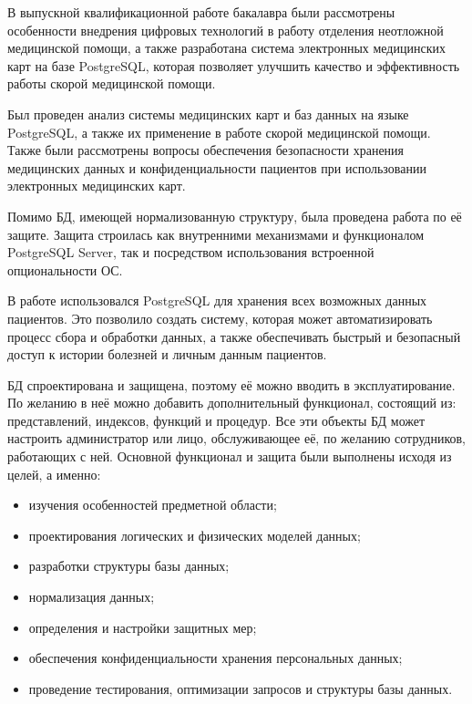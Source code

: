 \conclusion

В выпускной квалификационной работе бакалавра были рассмотрены особенности внедрения цифровых технологий в работу отделения неотложной медицинской помощи, а также разработана система электронных медицинских карт на базе PostgreSQL, которая позволяет улучшить качество и эффективность работы скорой медицинской помощи.

Был проведен анализ системы медицинских карт и баз данных на языке PostgreSQL, а также их применение в работе скорой медицинской помощи. Также были рассмотрены вопросы обеспечения безопасности хранения медицинских данных и конфиденциальности пациентов при использовании электронных медицинских карт.

Помимо БД, имеющей нормализованную структуру, была проведена работа по её защите. Защита строилась как внутренними механизмами и функционалом PostgreSQL Server, так и посредством использования встроенной опциональности ОС.

В работе использовался PostgreSQL для хранения всех возможных данных пациентов. Это позволило создать систему, которая может автоматизировать процесс сбора и обработки данных, а также обеспечивать быстрый и безопасный доступ к истории болезней и личным данным пациентов.

БД спроектирована и защищена, поэтому её можно вводить в эксплуатирование. По желанию в неё можно добавить дополнительный функционал, состоящий из: представлений, индексов, функций и процедур. Все эти объекты БД может настроить администратор или лицо, обслуживающее её, по желанию сотрудников, работающих с ней. Основной функционал и защита были выполнены исходя из целей, а именно:

\begin{itemize}
    \item изучения особенностей предметной области;
    \item проектирования логических и физических моделей данных;
    \item разработки структуры базы данных;
    \item нормализация данных;
    \item определения и настройки защитных мер;
    \item обеспечения конфиденциальности хранения персональных данных;
    \item проведение тестирования, оптимизации запросов и структуры базы данных.
\end{itemize}